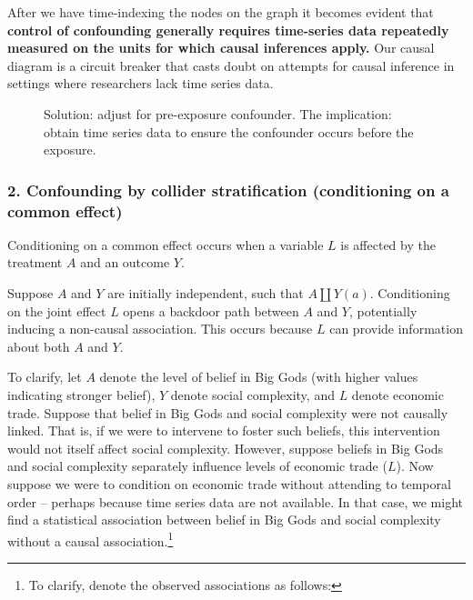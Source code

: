 \documentclass[
  singlecolumn,
  9pt]{article}
\begin{document}
After we have time-indexing the nodes on the graph it becomes evident
that \textbf{control of confounding generally requires time-series data
repeatedly measured on the units for which causal inferences apply.} Our
causal diagram is a circuit breaker that casts doubt on attempts for
causal inference in settings where researchers lack time series data.

\begin{figure}


\caption{\label{fig-dag-common-cause-solution}Solution: adjust for
pre-exposure confounder. The implication: obtain time series data to
ensure the confounder occurs before the exposure.}

\end{figure}%

\subsubsection{2. Confounding by collider stratification (conditioning
on a common
effect)}\label{confounding-by-collider-stratification-conditioning-on-a-common-effect}

Conditioning on a common effect occurs when a variable \(L\) is affected
by the treatment \(A\) and an outcome \(Y\).

Suppose \(A\) and \(Y\) are initially independent, such that
\(A \coprod Y(a)\). Conditioning on the joint effect \(L\) opens a
backdoor path between \(A\) and \(Y\), potentially inducing a non-causal
association. This occurs because \(L\) can provide information about
both \(A\) and \(Y\).

To clarify, let \(A\) denote the level of belief in Big Gods (with
higher values indicating stronger belief), \(Y\) denote social
complexity, and \(L\) denote economic trade. Suppose that belief in Big
Gods and social complexity were not causally linked. That is, if we were
to intervene to foster such beliefs, this intervention would not itself
affect social complexity. However, suppose beliefs in Big Gods and
social complexity separately influence levels of economic trade (\(L\)).
Now suppose we were to condition on economic trade without attending to
temporal order -- perhaps because time series data are not available. In
that case, we might find a statistical association between belief in Big
Gods and social complexity without a causal association.\footnote{To
  clarify, denote the observed associations as follows:}
\end{document}
